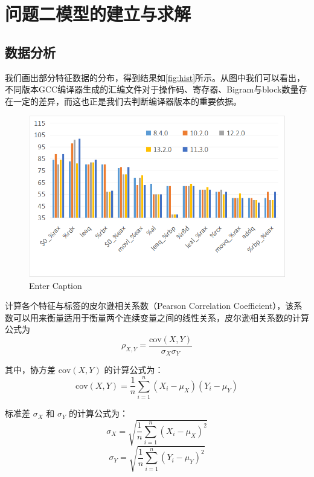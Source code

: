 \section{问题二模型的建立与求解}
  \subsection{数据分析}
  我们画出部分特征数据的分布，得到结果如\autoref{fig:hist}所示。从图中我们可以看出，不同版本GCC编译器生成的汇编文件对于操作码、寄存器、Bigram与block数量存在一定的差异，而这也正是我们去判断编译器版本的重要依据。
  \begin{figure}[H]
      \centering
      \includegraphics[width=1\linewidth]{figures/hist.png}
      \caption{Enter Caption}
      \label{fig:hist}
  \end{figure}


计算各个特征与标签的皮尔逊相关系数（Pearson Correlation Coefficient），该系数可以用来衡量适用于衡量两个连续变量之间的线性关系，皮尔逊相关系数的计算公式为
\begin{equation}
\rho_{X,Y} = \frac{\text{cov}(X, Y)}{\sigma_X \sigma_Y}
\label{eq:correlation}
\end{equation}

其中，协方差 \(\text{cov}(X, Y)\) 的计算公式为：
\begin{equation}
\text{cov}(X, Y) = \frac{1}{n} \sum_{i=1}^{n} (X_i - \mu_X)(Y_i - \mu_Y)
\label{eq:covariance}
\end{equation}

标准差 \(\sigma_X\) 和 \(\sigma_Y\) 的计算公式为：
\begin{equation}
\sigma_X = \sqrt{\frac{1}{n} \sum_{i=1}^{n} (X_i - \mu_X)^2}
\label{eq:stddev_x}
\end{equation}
\begin{equation}
\sigma_Y = \sqrt{\frac{1}{n} \sum_{i=1}^{n} (Y_i - \mu_Y)^2}
\label{eq:stddev_y}
\end{equation}

